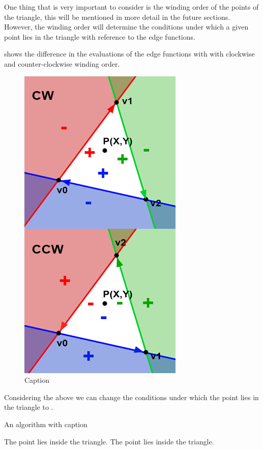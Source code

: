 One thing that is very important to consider is the winding order of the points of the triangle, this will be mentioned in more detail in the future sections. However, the winding order will determine the conditions under which a given point lies in the triangle with reference to the edge functions.

 shows the difference in the evaluations of the edge functions with with clockwise and counter-clockwise winding order.

\begin{figure}[ht]
    \centering
    \includegraphics{lit_review/images/EdgeFunctionTriangleWinding.png}
    \caption{Caption\cite{ScratchPixelRasterStage}}
    \label{fig:edgeFunctionTrianglWinding}
\end{figure}

Considering the above we can change the conditions under which the point lies in the triangle to .

\begin{algorithm}
\caption{An algorithm with caption}\label{algorithm:pointInsideTriangleConditionFull}
\begin{algorithmic}
            \State The point lies inside the triangle.
        \EndIf
    \EndIf
            \State The point lies inside the triangle.
        \EndIf
    \EndIf
\end{algorithmic}
\end{algorithm}

